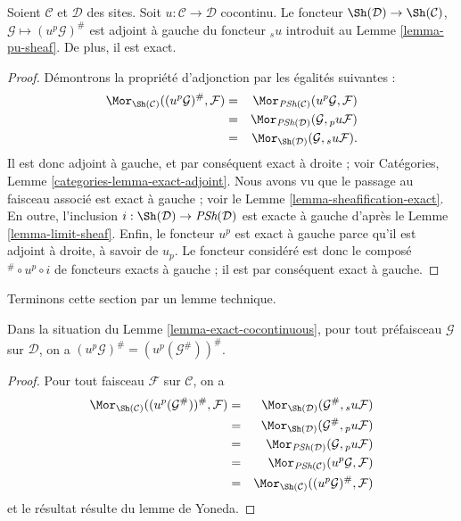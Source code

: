 \begin{lemma}
\label{lemma-exact-cocontinuous}
Soient $\mathcal{C}$ et $\mathcal{D}$ des sites.
Soit $u : \mathcal{C} \to \mathcal{D}$ cocontinu.
Le foncteur
$\Sh(\mathcal{D}) \to \Sh(\mathcal{C})$,
$\mathcal{G} \mapsto (u^p\mathcal{G})^\#$
est adjoint à gauche du foncteur ${}_su$ introduit au
Lemme \ref{lemma-pu-sheaf}. De plus, il est exact.
\end{lemma}

\begin{proof}
Démontrons la propriété d’adjonction par les égalités suivantes :
\begin{eqnarray*}
\Mor_{\Sh(\mathcal{C})}
((u^p\mathcal{G})^\#, \mathcal{F})
& = &
\Mor_{\textit{PSh}(\mathcal{C})}
(u^p\mathcal{G}, \mathcal{F}) \\
& = &
\Mor_{\textit{PSh}(\mathcal{D})}
(\mathcal{G}, {}_pu\mathcal{F}) \\
& = &
\Mor_{\Sh(\mathcal{D})}
(\mathcal{G}, {}_su\mathcal{F}).
\end{eqnarray*}
Il est donc adjoint à gauche, et par conséquent exact à droite ; voir
Catégories, Lemme \ref{categories-lemma-exact-adjoint}.
Nous avons vu que le passage au faisceau associé est exact à gauche ; voir le
Lemme \ref{lemma-sheafification-exact}.
En outre, l’inclusion
$i : \Sh(\mathcal{D}) \to \textit{PSh}(\mathcal{D})$
est exacte à gauche d’après le Lemme \ref{lemma-limit-sheaf}.
Enfin, le foncteur $u^p$ est exact à gauche parce qu’il est adjoint à droite,
à savoir de $u_p$. Le foncteur considéré est donc le composé
${}^\# \circ u^p \circ i$ de foncteurs exacts à gauche ;
il est par conséquent exact à gauche.
\end{proof}

\noindent
Terminons cette section par un lemme technique.

\begin{lemma}
\label{lemma-technical-pu}
Dans la situation du Lemme \ref{lemma-exact-cocontinuous},
pour tout préfaisceau $\mathcal{G}$ sur $\mathcal{D}$, on a
$(u^p\mathcal{G})^\# = (u^p(\mathcal{G}^\#))^\#$.
\end{lemma}

\begin{proof}
Pour tout faisceau $\mathcal{F}$ sur $\mathcal{C}$, on a
\begin{eqnarray*}
\Mor_{\Sh(\mathcal{C})}((u^p(\mathcal{G}^\#))^\#, \mathcal{F})
& = &
\Mor_{\Sh(\mathcal{D})}(\mathcal{G}^\#, {}_su\mathcal{F}) \\
& = &
\Mor_{\Sh(\mathcal{D})}(\mathcal{G}^\#, {}_pu\mathcal{F}) \\
& = &
\Mor_{\textit{PSh}(\mathcal{D})}(\mathcal{G}, {}_pu\mathcal{F}) \\
& = &
\Mor_{\textit{PSh}(\mathcal{C})}(u^p\mathcal{G}, \mathcal{F}) \\
& = &
\Mor_{\Sh(\mathcal{C})}((u^p\mathcal{G})^\#, \mathcal{F})
\end{eqnarray*}
et le résultat résulte du lemme de Yoneda.
\end{proof}

